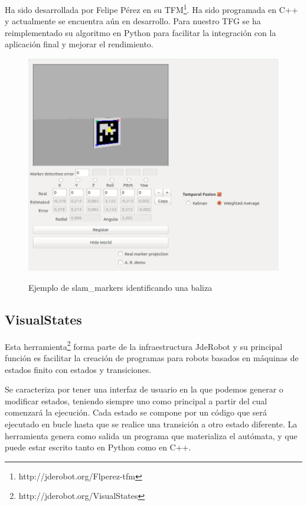 {	Ha sido desarrollada por Felipe Pérez en su TFM\footnote{http://jderobot.org/Flperez-tfm}. Ha sido programada en C++ y actualmente se encuentra aún en desarrollo. Para nuestro TFG se ha reimplementado su algoritmo en Python para facilitar la integración con la aplicación final y mejorar el rendimiento.
	
	\begin{figure}[H]
		\centering
		{\includegraphics[scale=0.4]{imag/slam_markers_ui.png}}
		\caption{Ejemplo de slam\_markers identificando una baliza}
		
		\label{FIG:32_slamMarkers}
	\end{figure}
	
	
	\subsection{VisualStates}
	\label{subsec:VisualStates}
	
	Esta herramienta\footnote{http://jderobot.org/VisualStates} forma parte de la infraestructura JdeRobot  y su principal función es facilitar la creación de programas para robots basados en máquinas de estados finito con estados y transiciones. 
	
	Se caracteriza por tener una interfaz de usuario en la que podemos generar o modificar estados, teniendo siempre uno como principal a partir del cual comenzará la ejecución.
	Cada estado se compone por un código que será ejecutado en bucle hasta que se realice una transición a otro estado diferente. La herramienta genera como salida un programa que materializa el autómata, y que puede estar escrito tanto en Python como en C++.
	
}
